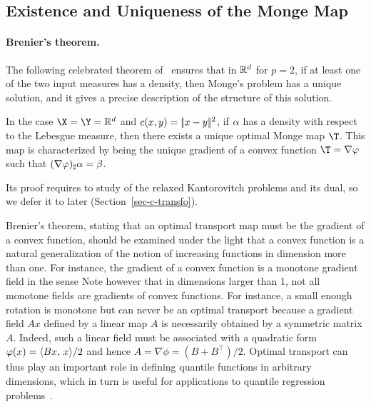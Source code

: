 \subsection{Existence and Uniqueness of the Monge Map}

\paragraph{Brenier's theorem.}

The following celebrated theorem of~\cite{Brenier91} ensures that in $\mathbb{R}^d$ for $p=2$, if at least one of the two input measures has a density, then Monge's problem has a unique solution, and it gives a precise description of the structure of this solution.

\begin{thm}[Brenier]\label{thm-brenier}
	In the case $\X=\Y=\RR^\dims$ and $c(x,y)=|\!| x-y |\!|^2$, if $\alpha$ has a density with respect to the Lebesgue measure, then there exists a unique optimal Monge map $\T$. This map is characterized by being the unique gradient of a convex function $\T=\nabla \phi$ such that $(\nabla \varphi)_\sharp \alpha = \beta$. 
\end{thm}

Its proof requires to study of the relaxed Kantorovitch problems and its dual, so we defer it to later (Section~\ref{sec-c-transfo}). 

Brenier's theorem, stating that an optimal transport map must be the gradient of a convex function, should be examined under the light that a convex function is a natural generalization of the notion of increasing functions in dimension more than one. 
%
For instance, the gradient of a convex function is a monotone gradient field in the sense
Note however that in dimensions larger than 1, not all monotone fields are gradients of convex functions. For instance, a small enough rotation is monotone but can never be an optimal transport because a gradient field $Ax$ defined by a linear map $A$ is necessarily obtained by a symmetric matrix $A$. Indeed, such a linear field must be associated with a quadratic form $\varphi(x)=\langle Bx,\,x\rangle/2$
and hence $A=\nabla \phi = (B+B^\top)/2$.
%
Optimal transport can thus play an important role in defining quantile functions in arbitrary dimensions, which in turn is useful for applications to quantile regression problems~\cite{carlier2016vector}.
 

